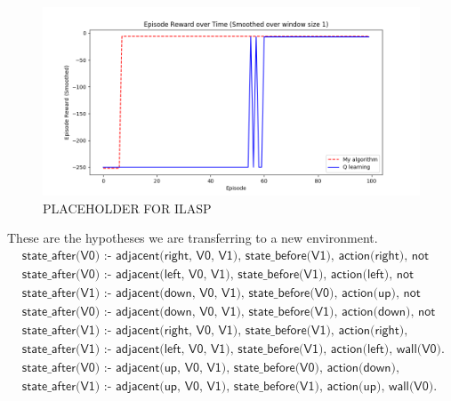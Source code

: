 \begin{figure}[!htb]
\centering
\includegraphics[width=1.0\textwidth]{./figures/experiment1_test}
\caption{PLACEHOLDER FOR ILASP}
\label{experiment1_test}
\end{figure}
    

These are the hypotheses we are transferring to a new environment. 
\begin{equation*}
\begin{split}
 &\textsf{state\_after(V0) :- adjacent(right, V0, V1), state\_before(V1), action(right), not wall(V0).}\\
 &\textsf{state\_after(V0) :- adjacent(left, V0, V1), state\_before(V1), action(left), not wall(V0).}\\
 &\textsf{state\_after(V1) :- adjacent(down, V0, V1), state\_before(V0), action(up), not wall(V1).}\\
 &\textsf{state\_after(V0) :- adjacent(down, V0, V1), state\_before(V1), action(down), not wall(V0).}\\
 &\textsf{state\_after(V1) :- adjacent(right, V0, V1), state\_before(V1), action(right), wall(V0).}\\
 &\textsf{state\_after(V1) :- adjacent(left, V0, V1), state\_before(V1), action(left), wall(V0).}\\
 &\textsf{state\_after(V0) :- adjacent(up, V0, V1), state\_before(V0), action(down), wall(V1).}\\
 &\textsf{state\_after(V1) :- adjacent(up, V0, V1), state\_before(V1), action(up), wall(V0).}
\end{split}
\end{equation*}


